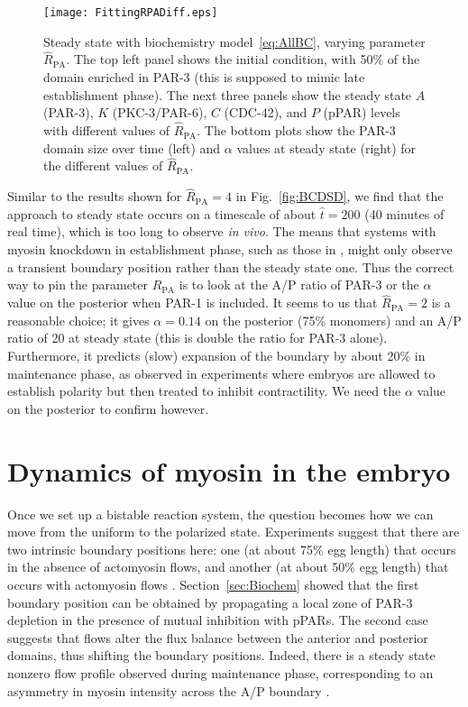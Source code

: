 \documentclass[11pt]{article}
\newcommand{\red}[1]{\color{red}#1\normalcolor}
\newcommand{\6}[1]{#1_{\text{6}}}
\newcommand{\3}[1]{#1_{\text{3}}}
\begin{document}
\begin{figure}
\centering
\texttt{[image: FittingRPADiff.eps]}
\caption{\label{fig:BCSS}Steady state with biochemistry model\ \eqref{eq:AllBC}, varying parameter $\hat R_\text{PA}$. The top left panel shows the initial condition, with 50\% of the domain enriched in PAR-3 (this is supposed to mimic late establishment phase). The next three panels show the steady state $A$ (PAR-3), $K$ (PKC-3/PAR-6), $C$ (CDC-42), and $P$ (pPAR) levels with different values of $\hat R_\text{PA}$. The bottom plots show the PAR-3 domain size over time (left) and $\alpha$ values at steady state (right) for the different values of $\hat R_\text{PA}$. }
\end{figure}

Similar to the results shown for $\hat R_\text{PA}=4$ in Fig.\ \ref{fig:BCDSD}, we find that the approach to steady state occurs on a timescale of about $\hat t = 200$ (40 minutes of real time), which is too long to observe \emph{in vivo}. The means that systems with myosin knockdown in establishment phase, such as those in \cite{zonies2010symmetry}, might only observe a transient boundary position rather than the steady state one. Thus the correct way to pin the parameter $\hat R_\text{PA}$ is to look at the A/P ratio of PAR-3 or the $\alpha$ value on the posterior when PAR-1 is included. It seems to us that $\hat R_\text{PA}=2$ is a reasonable choice; it gives $\alpha=0.14$ on the posterior (75\% monomers) and an A/P ratio of 20 at steady state (this is double the ratio for PAR-3 alone). Furthermore, it predicts (slow) expansion of the boundary by about 20\% in maintenance phase, as observed in experiments where embryos are allowed to establish polarity but then treated to inhibit contractility. \red{We need the $\alpha$ value on the posterior to confirm however.}


\section{Dynamics of myosin in the embryo \label{sec:myosin}}
Once we set up a bistable reaction system, the question becomes how we can move from the uniform to the polarized state. Experiments suggest that there are two intrinsic boundary positions here: one (at about 75\% egg length) that occurs in the absence of actomyosin flows, and another (at about 50\% egg length) that occurs with actomyosin flows \cite{zonies2010symmetry}. Section\ \ref{sec:Biochem} showed that the first boundary position can be obtained by propagating a local zone of PAR-3 depletion in the presence of mutual inhibition with pPARs. The second case suggests that flows alter the flux balance between the anterior and posterior domains, thus shifting the boundary positions. Indeed, there is a steady state nonzero flow profile observed during maintenance phase, corresponding to an asymmetry in myosin intensity across the A/P boundary \cite{sailer2015dynamic}.
\end{document}
